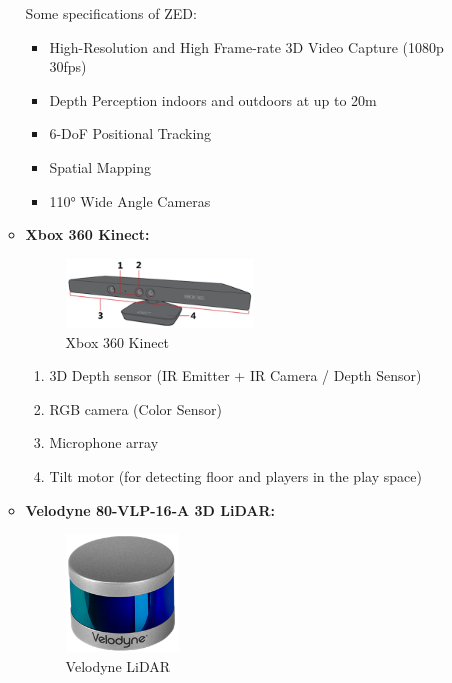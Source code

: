 \documentclass[12pt]{article}
\begin{document}
\begin{itemize}
\begin{itemize}
                    Some specifications of ZED: 
                    
                    \begin{itemize}
                        \item High-Resolution and High Frame-rate 3D Video Capture (1080p 30fps)
                        \item Depth Perception indoors and outdoors at up to 20m
                        \item 6-DoF Positional Tracking
                        \item Spatial Mapping
                        \item 110° Wide Angle Cameras
                    \end{itemize}
                    
              \item \textbf{Xbox 360 Kinect:} \\
                    \begin{figure}[H]
                        \centering
                        \includegraphics[width=0.5\textwidth]{XBoxKinect.png}
                        \caption{Xbox 360 Kinect~\cite{XboxKinect}}
                    \end{figure}
                    
                    \begin{enumerate}
                        \item 3D Depth sensor (IR Emitter + IR Camera / Depth Sensor)
                        \item RGB camera (Color Sensor)
                        \item Microphone array
                        \item Tilt motor (for detecting floor and players in the play space)
                    \end{enumerate}
                    
              \item \textbf{Velodyne 80-VLP-16-A 3D LiDAR:} \\
                    \begin{figure}[H]
                        \centering
                        \includegraphics[width=0.3\textwidth]{LiDAR.png}
                        \caption{Velodyne LiDAR}
                    \end{figure}
                    

\end{itemize}
\end{itemize}
\end{document}
